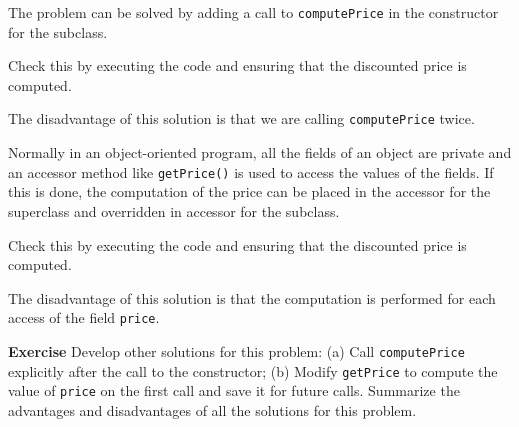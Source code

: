 \bigskip


The problem can be solved by adding a call to 
\texttt{computePrice} in the constructor for the subclass. 

Check this by executing the code and ensuring that the discounted price is computed.

The disadvantage of this solution is that we are calling 
\texttt{computePrice} twice.

\bigskip


Normally in an object-oriented program, all the 
fields of an object are private and an accessor method like 
\texttt{getPrice()} is used to access the values of the fields.
If this is done, the computation of the price can be placed in 
the accessor for the superclass and overridden in accessor for the 
subclass. 

Check this by executing the code and ensuring that the discounted price is computed.

The disadvantage of this solution is that the computation is 
performed for each access of the field \texttt{price}.

\textbf{Exercise} Develop other solutions for this problem: (a) Call
\texttt{computePrice} explicitly after the call to the constructor; (b)
Modify \texttt{getPrice} to compute the value of \texttt{price} on the first
call and save it for future calls. Summarize the advantages and
disadvantages of all the solutions for this problem.
